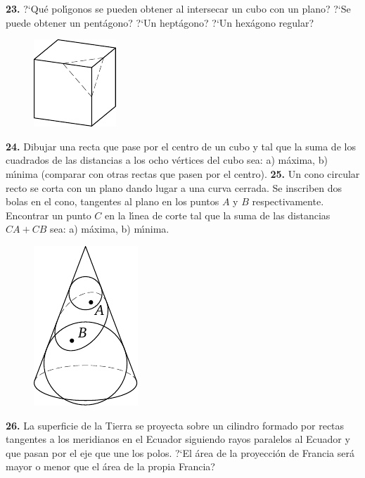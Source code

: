 \documentclass[12pt]{article}  %
\begin{document}
\newpage
\noindent
{\bf 23.} ?`Qu\'e pol\'{\i}gonos se pueden obtener al intersecar un cubo con un plano? ?`Se puede obtener un pent\'agono? ?`Un hept\'agono? 
?`Un hex\'agono regular?
\begin{figure}[h]
\centering
\footnotesize
\includegraphics[scale=1]{taskbook-7}
\end{figure}
\newline\newline\quad
{\bf 24.} Dibujar una recta que pase por el centro de un cubo y tal que la suma de los cuadrados de las distancias a los ocho v\'ertices del cubo sea:
a) m\'axima,
\newline
b) m\'{\i}nima (comparar con otras rectas que pasen por el centro).
\newline\newline\quad
{\bf 25.} Un cono circular recto se corta con un plano dando lugar a una curva cerrada. Se inscriben dos bolas en el cono, tangentes al plano en los puntos $A$ y $B$ respectivamente. 
Encontrar un punto $C$ en la l\'{\i}nea de corte tal que la suma de las distancias $CA + CB$ sea:
 a) m\'axima, b) m\'{\i}nima.
\begin{figure}[h]
\centering
\footnotesize
\includegraphics[scale=1]{taskbook-9}
\end{figure}
\newline\newline\quad
{\bf 26.} La superficie de la Tierra se proyecta sobre un cilindro formado por rectas tangentes a los meridianos en el Ecuador siguiendo rayos paralelos al Ecuador y que pasan por el eje que une los polos.
?`El \'area de la proyecci\'on de Francia ser\'a mayor o menor que el \'area de la propia Francia?
\end{document}
